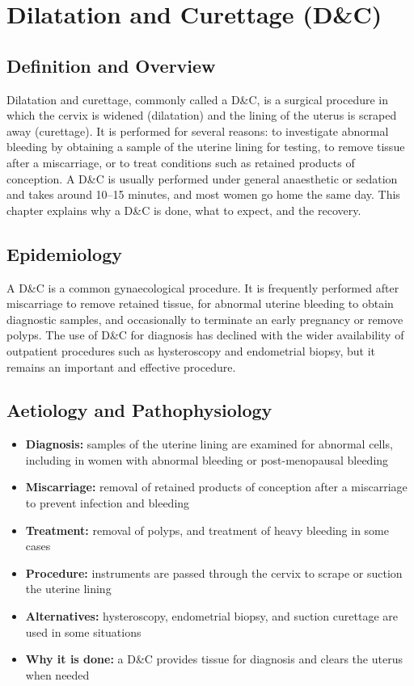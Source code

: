 \chapter{Dilatation and Curettage (D\&C)}

\section*{Definition and Overview}
Dilatation and curettage, commonly called a D\&C, is a surgical procedure in which the cervix is widened (dilatation) and the lining of the uterus is scraped away (curettage). It is performed for several reasons: to investigate abnormal bleeding by obtaining a sample of the uterine lining for testing, to remove tissue after a miscarriage, or to treat conditions such as retained products of conception. A D\&C is usually performed under general anaesthetic or sedation and takes around 10--15 minutes, and most women go home the same day. This chapter explains why a D\&C is done, what to expect, and the recovery.

\section*{Epidemiology}
A D\&C is a common gynaecological procedure. It is frequently performed after miscarriage to remove retained tissue, for abnormal uterine bleeding to obtain diagnostic samples, and occasionally to terminate an early pregnancy or remove polyps. The use of D\&C for diagnosis has declined with the wider availability of outpatient procedures such as hysteroscopy and endometrial biopsy, but it remains an important and effective procedure.

\section*{Aetiology and Pathophysiology}
\begin{itemize}
    \item \textbf{Diagnosis:} samples of the uterine lining are examined for abnormal cells, including in women with abnormal bleeding or post-menopausal bleeding
    \item \textbf{Miscarriage:} removal of retained products of conception after a miscarriage to prevent infection and bleeding
    \item \textbf{Treatment:} removal of polyps, and treatment of heavy bleeding in some cases
    \item \textbf{Procedure:} instruments are passed through the cervix to scrape or suction the uterine lining
    \item \textbf{Alternatives:} hysteroscopy, endometrial biopsy, and suction curettage are used in some situations
    \item \textbf{Why it is done:} a D\&C provides tissue for diagnosis and clears the uterus when needed
\end{itemize}

